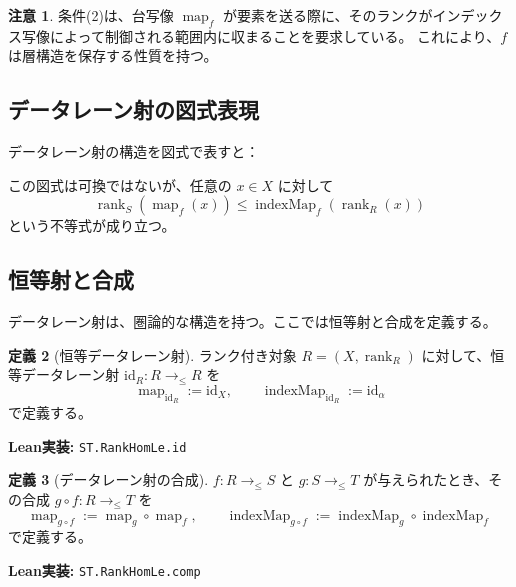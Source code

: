 \documentclass[a4paper,12pt]{ltjsarticle}
\theoremstyle{definition}
\newtheorem{definition}{定義}[section]
\newtheorem{remark}[definition]{注意}
\begin{document}
\begin{remark}
条件(2)は、台写像 $\operatorname{map}_f$ が要素を送る際に、そのランクがインデックス写像によって制御される範囲内に収まることを要求している。
これにより、$f$ は層構造を保存する性質を持つ。
\end{remark}

\subsection{データレーン射の図式表現}

データレーン射の構造を図式で表すと：

\begin{center}
\end{center}

この図式は可換ではないが、任意の $x \in X$ に対して
\[
\operatorname{rank}_S(\operatorname{map}_f(x)) \le \operatorname{indexMap}_f(\operatorname{rank}_R(x))
\]
という不等式が成り立つ。

\subsection{恒等射と合成}

データレーン射は、圏論的な構造を持つ。ここでは恒等射と合成を定義する。

\begin{definition}[恒等データレーン射]
\label{def:rankhomle-id}
ランク付き対象 $R = (X, \operatorname{rank}_R)$ に対して、恒等データレーン射
$\mathrm{id}_R : R \to_{\le} R$ を
\[
  \operatorname{map}_{\mathrm{id}_R} := \mathrm{id}_X, \qquad
  \operatorname{indexMap}_{\mathrm{id}_R} := \mathrm{id}_\alpha
\]
で定義する。

\textbf{Lean実装:} \texttt{ST.RankHomLe.id}
\end{definition}

\begin{definition}[データレーン射の合成]
\label{def:rankhomle-comp}
$f : R \to_{\le} S$ と $g : S \to_{\le} T$ が与えられたとき、その合成
$g \circ f : R \to_{\le} T$ を
\[
  \operatorname{map}_{g\circ f} := \operatorname{map}_g \circ \operatorname{map}_f, \qquad
  \operatorname{indexMap}_{g\circ f} := \operatorname{indexMap}_g \circ \operatorname{indexMap}_f
\]
で定義する。

\textbf{Lean実装:} \texttt{ST.RankHomLe.comp}
\end{definition}
\end{document}
